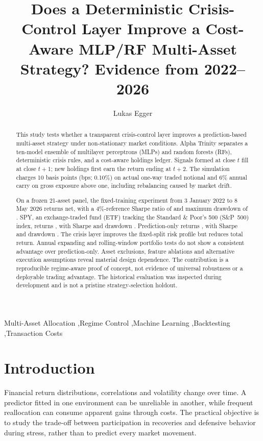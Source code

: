 \documentclass[3p,times]{elsarticle}
\begin{document}
\begin{frontmatter}
\title{Does a Deterministic Crisis-Control Layer Improve a Cost-Aware MLP/RF Multi-Asset Strategy? Evidence from 2022--2026}
\author[a]{Lukas Egger}
\address[a]{University of Klagenfurt, Universit\"atsstra\ss e 65--67, 9020 Klagenfurt, Austria}
\begin{abstract}
This study tests whether a transparent crisis-control layer improves a prediction-based multi-asset strategy under non-stationary market conditions. Alpha Trinity separates a ten-model ensemble of multilayer perceptrons (MLPs) and random forests (RFs), deterministic crisis rules, and a cost-aware holdings ledger. Signals formed at close $t$ fill at close $t+1$; new holdings first earn the return ending at $t+2$. The simulation charges 10 basis points (bps; 0.10\%) on actual one-way traded notional and 6\% annual carry on gross exposure above one, including rebalancing caused by market drift.

On a frozen 21-asset panel, the fixed-training experiment from 3 January 2022 to 8 May 2026 returns \FullReturn{} net, with a 4\%-reference Sharpe ratio of \FullSharpe{} and maximum drawdown of \FullDrawdown{}. SPY, an exchange-traded fund (ETF) tracking the Standard \& Poor's 500 (S\&P~500) index, returns \SpyReturn{}, with Sharpe \SpySharpe{} and drawdown \SpyDrawdown{}. Prediction-only returns \PredReturn{}, with Sharpe \PredSharpe{} and drawdown \PredDrawdown{}. The crisis layer improves the fixed-split risk profile but reduces total return. Annual expanding and rolling-window portfolio tests do not show a consistent advantage over prediction-only. Asset exclusions, feature ablations and alternative execution assumptions reveal material design dependence. The contribution is a reproducible regime-aware proof of concept, not evidence of universal robustness or a deployable trading advantage. The historical evaluation was inspected during development and is not a pristine strategy-selection holdout.
\end{abstract}
\begin{keyword}
Multi-Asset Allocation \sep Regime Control \sep Machine Learning \sep Backtesting \sep Transaction Costs
\end{keyword}
\end{frontmatter}

\section{Introduction}
Financial return distributions, correlations and volatility change over time. A predictor fitted in one environment can be unreliable in another, while frequent reallocation can consume apparent gains through costs. The practical objective is to study the trade-off between participation in recoveries and defensive behavior during stress, rather than to predict every market movement.
\end{document}
